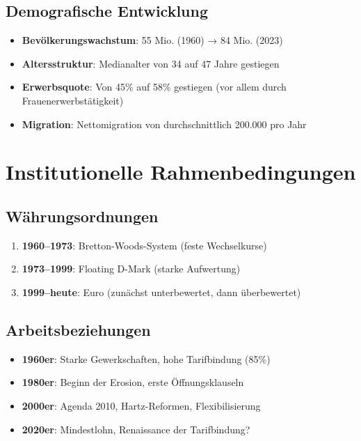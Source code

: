\subsection{Demografische Entwicklung}
\begin{itemize}
\item \textbf{Bevölkerungswachstum}: 55 Mio. (1960) → 84 Mio. (2023)
\item \textbf{Altersstruktur}: Medianalter von 34 auf 47 Jahre gestiegen
\item \textbf{Erwerbsquote}: Von 45\% auf 58\% gestiegen (vor allem durch Frauenerwerbstätigkeit)
\item \textbf{Migration}: Nettomigration von durchschnittlich 200.000 pro Jahr
\end{itemize}

\section{Institutionelle Rahmenbedingungen}

\subsection{Währungsordnungen}
\begin{enumerate}
\item \textbf{1960--1973}: Bretton-Woods-System (feste Wechselkurse)
\item \textbf{1973--1999}: Floating D-Mark (starke Aufwertung)
\item \textbf{1999--heute}: Euro (zunächst unterbewertet, dann überbewertet)
\end{enumerate}

\subsection{Arbeitsbeziehungen}
\begin{itemize}
\item \textbf{1960er}: Starke Gewerkschaften, hohe Tarifbindung (85\%)
\item \textbf{1980er}: Beginn der Erosion, erste Öffnungsklauseln
\item \textbf{2000er}: Agenda 2010, Hartz-Reformen, Flexibilisierung
\item \textbf{2020er}: Mindestlohn, Renaissance der Tarifbindung?
\end{itemize}

